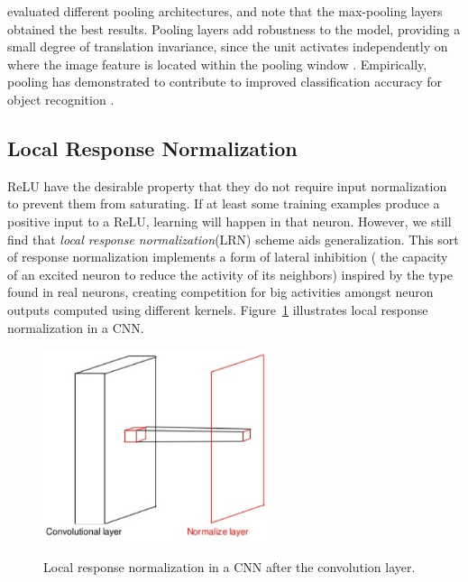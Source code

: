 \citealt{scherer2010evaluation} evaluated different pooling architectures, and note that the max-pooling layers obtained the best results. Pooling layers add robustness to the model, providing a small degree of translation invariance, since the unit activates independently on where the image feature is located within the pooling window \cite{bengio2013deep}. Empirically, pooling has demonstrated to contribute to improved classification accuracy for object recognition \cite{lecun1989backpropagation}.


\subsection{Local Response Normalization}
\label{lrnlayer}
ReLU have the desirable property that they do not require input normalization to prevent them from saturating. If at least some training examples produce a positive input to a ReLU, learning will happen in that neuron. However, we still find that \textit{local response normalization}(LRN) scheme aids generalization. This sort of response normalization implements a form of lateral inhibition ( the capacity of an excited neuron to reduce the activity of its neighbors) inspired by the type found in real neurons, creating competition for big activities amongst neuron outputs computed using different kernels\cite{krizhevsky2012imagenet}. Figure~\ref{fig:lrns} illustrates local response normalization in a CNN. 
\begin{figure}[H]
	\centering
	{\includegraphics[width=0.6\textwidth]{images/lrn}}
	\caption{Local response normalization in a CNN after the convolution layer.}
	\label{fig:lrns}
\end{figure}

